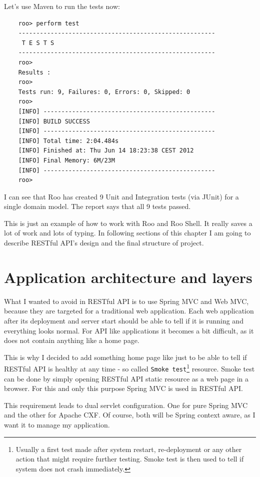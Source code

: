 	Let's use Maven to run the tests now:
	
	\begin{verbatim}
	roo> perform test
	-------------------------------------------------------
	 T E S T S
	-------------------------------------------------------
	roo>
	Results :
	roo>
	Tests run: 9, Failures: 0, Errors: 0, Skipped: 0
	roo>
	[INFO] ------------------------------------------------
	[INFO] BUILD SUCCESS
	[INFO] ------------------------------------------------
	[INFO] Total time: 2:04.484s
	[INFO] Finished at: Thu Jun 14 18:23:38 CEST 2012
	[INFO] Final Memory: 6M/23M
	[INFO] ------------------------------------------------
	roo>
	\end{verbatim}
	
	I can see that Roo has created 9 Unit and Integration tests (via JUnit) for a single domain model. The report says that
	all 9 tests passed.
	
	This is just an example of how to work with Roo and Roo Shell. It really saves a lot of work and lots of typing. In
	following sections of this chapter I am going to describe RESTful API's design and the final structure of project.
	
	\section{Application architecture and layers}
	
	What I wanted to avoid in RESTful API is to use Spring MVC and Web MVC, because they are targeted for a traditional web
	application. Each web application after its deployment and server start should be able to tell if it is running and
	everything looks normal. For API like applications it becomes a bit difficult, as it does not contain anything like a
	home page. 
	
	This is why I decided to add something home page like just to be able to tell if RESTful API is healthy at
	any time - so called \verb|Smoke test|\footnote{Usually a first test made after system restart, re-deployment or any
	other action that might require further testing. Smoke test is then used to tell if system does not crash
	immediately.} resource. Smoke test can be done by simply opening RESTful API static resource as a web page in a
	browser. For this and only this purpose Spring MVC is used in RESTful API. 
	
	This requirement leads to dual servlet configuration. One for pure Spring MVC and the other for Apache CXF. Of course,
	both will be Spring context aware, as I want it to manage my application.
	
